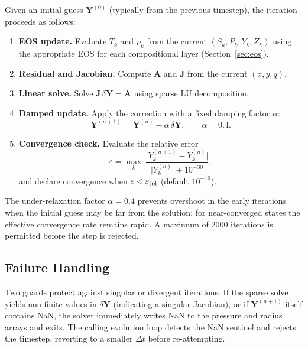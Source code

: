 \documentclass{aastex631}
\begin{document}
Given an initial guess $\mathbf{Y}^{(0)}$ (typically from the previous
timestep), the iteration proceeds as follows:
\begin{enumerate}
  \item \textbf{EOS update.}  Evaluate $T_k$ and $\rho_k$ from the
    current $(S_k, P_k, Y_k, Z_k)$ using the appropriate EOS for each
    compositional layer (Section~\ref{sec:eos}).
  \item \textbf{Residual and Jacobian.}  Compute $\mathbf{A}$ and
    $\mathbf{J}$ from the current $(x, y, q)$.
  \item \textbf{Linear solve.}  Solve $\mathbf{J}\,\delta\mathbf{Y}
    = \mathbf{A}$ using sparse LU decomposition.
  \item \textbf{Damped update.}  Apply the correction with a fixed
    damping factor $\alpha$:
    \begin{equation}\label{eq:update}
      \mathbf{Y}^{(n+1)} = \mathbf{Y}^{(n)} - \alpha\,\delta\mathbf{Y},
      \qquad \alpha = 0.4.
    \end{equation}
  \item \textbf{Convergence check.}  Evaluate the relative error
    \begin{equation}\label{eq:convergence}
      \varepsilon
      = \max_{k}\,
        \frac{\bigl|Y_k^{(n+1)} - Y_k^{(n)}\bigr|}
             {\bigl|Y_k^{(n)}\bigr| + 10^{-30}},
    \end{equation}
    and declare convergence when $\varepsilon < \varepsilon_{\rm tol}$
    (default $10^{-10}$).
\end{enumerate}
The under-relaxation factor $\alpha = 0.4$ prevents overshoot in the
early iterations when the initial guess may be far from the solution;
for near-converged states the effective convergence rate remains
rapid.  A maximum of 2000 iterations is permitted before the step
is rejected.

\subsection{Failure Handling}

Two guards protect against singular or divergent iterations.  If the
sparse solve yields non-finite values in $\delta\mathbf{Y}$ (indicating
a singular Jacobian), or if $\mathbf{Y}^{(n+1)}$ itself contains NaN,
the solver immediately writes NaN to the pressure and radius arrays and
exits.  The calling evolution loop detects the NaN sentinel and rejects
the timestep, reverting to a smaller $\Delta t$ before re-attempting.
\end{document}
